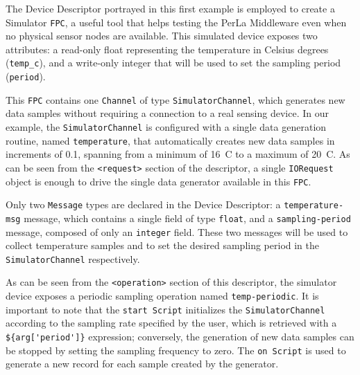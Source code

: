 The Device Descriptor portrayed in this first example is employed to create a
Simulator \texttt{FPC}, a useful tool that helps testing the PerLa Middleware
even when no physical sensor nodes are available. This simulated device exposes
two attributes: a read-only float representing the temperature in Celsius
degrees (\texttt{temp\_c}), and a write-only integer that will be used to set
the sampling period (\texttt{period}).

This \texttt{FPC} contains one \texttt{Channel} of type
\texttt{SimulatorChannel}, which generates new data samples without requiring a
connection to a real sensing device. In our example, the
\texttt{SimulatorChannel} is configured with a single data generation routine,
named \texttt{temperature}, that automatically creates new data samples in
increments of 0.1\degree, spanning from a minimum of 16\degree~C to a maximum
of 20\degree~C. As can be seen from the \lstinline!<request>! section of the
descriptor, a single \texttt{IORequest} object is enough to drive the single
data generator available in this \texttt{FPC}.

Only two \texttt{Message} types are declared in the Device Descriptor: a
\texttt{temperature-msg} message, which contains a single field of type
\texttt{float}, and a \texttt{sampling-period} message, composed of only an
\texttt{integer} field. These two messages will be used to collect temperature
samples and to set the desired sampling period in the \texttt{SimulatorChannel}
respectively.

As can be seen from the \lstinline!<operation>! section of this descriptor, the
simulator device exposes a periodic sampling operation named
\texttt{temp-periodic}. It is important to note that the \texttt{start Script}
initializes the \texttt{SimulatorChannel} according to the sampling rate
specified by the user, which is retrieved with a \lstinline!${arg['period']}!
expression; conversely, the generation of new data samples can be stopped by
setting the sampling frequency to zero. The \texttt{on Script} is used to
generate a new record for each sample created by the generator.

